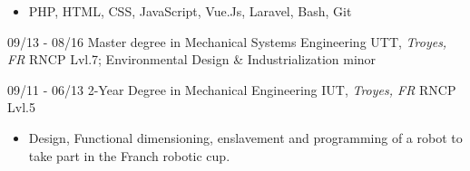 \documentclass[]{friggeri-cv}
\begin{document}
\vspace*{-0.35cm}
\begin{itemize}
\setlength{\itemsep}{1pt}
\setlength{\parskip}{0pt}
\setlength{\parsep}{0pt}

\item PHP, HTML, CSS, JavaScript, Vue.Js, Laravel, Bash, Git
\end{itemize}\vspace{0.5mm}
\begin{entrylist}
  \entry
    {09/13 - 08/16}
    {Master degree in Mechanical Systems Engineering}
    {UTT, \textit{Troyes, FR}}
    {RNCP Lvl.7; Environmental Design \& Industrialization minor}
\end{entrylist}
\vspace{0.5mm}
\begin{entrylist}
  \entry
    {09/11 - 06/13}
    {2-Year Degree in Mechanical Engineering}
    {IUT, \textit{Troyes, FR}}
    {RNCP Lvl.5}
\end{entrylist}
\vspace*{-0.4cm}
\begin{itemize}
\setlength{\itemsep}{1pt}
\setlength{\parskip}{0pt}
\setlength{\parsep}{0pt}
\item Design, Functional dimensioning, enslavement and programming of a robot to take part in the Franch robotic cup.
\end{itemize}
\end{document}
